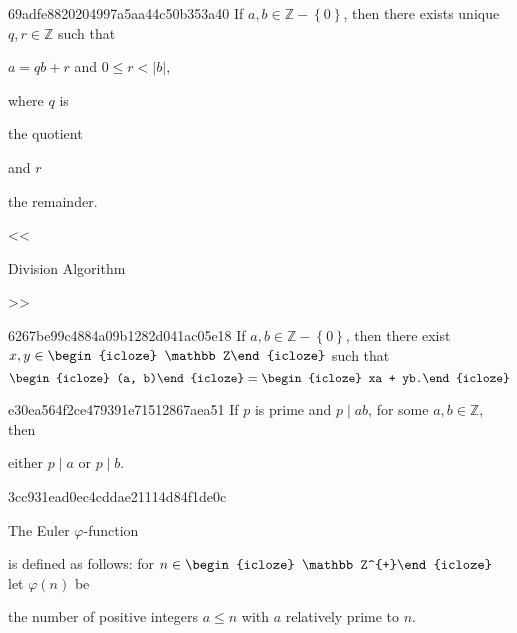 \begin{note}{69adfe8820204997a5aa44c50b353a40}
    If \({ a, b \in \mathbb Z - \left\{ 0 \right\} }\), then there exists unique \({ q, r \in \mathbb Z }\) such that
    \begin{center}
        \({ a = q b + r }\) and \({ 0 \leqslant r < \left\lvert b \right\rvert }\),
    \end{center}
    where \({ q }\) is \begin{icloze}{1}the quotient\end{icloze} and \({ r }\) \begin{icloze}{1}the remainder.\end{icloze}

    \begin{center}
        \tiny
        <<\begin{icloze}{2}Division Algorithm\end{icloze}>>
    \end{center}
\end{note}

\begin{note}{6267be99c4884a09b1282d041ac05e18}
    If \({ a, b \in \mathbb Z - \left\{ 0 \right\} }\), then there exist \({ x, y \in \begin{icloze}{3}\mathbb Z\end{icloze} }\) such that
    \[
        \begin{icloze}{2}(a, b)\end{icloze} = \begin{icloze}{1}xa + yb.\end{icloze}
    \]
\end{note}

\begin{note}{e30ea564f2ce479391e71512867aea51}
    If \({ p }\) is prime and \({ p \mid ab }\), for some \({ a, b \in \mathbb Z }\), then
    \begin{icloze}{1}
        \begin{center}
            either \({ p \mid a }\) or \({ p \mid b }\).
        \end{center}
    \end{icloze}
\end{note}

\begin{note}{3cc931ead0ec4cddae21114d84f1de0c}
    \begin{icloze}{3}The Euler \({ \varphi }\)-function\end{icloze} is defined as follows: for \({ n \in \begin{icloze}{2}\mathbb Z^{+}\end{icloze} }\) let \({ \varphi(n) }\) be \begin{icloze}{1}the number of positive integers \({ a \leq n }\) with \({ a }\) relatively prime to \({ n }\).\end{icloze}
\end{note}

